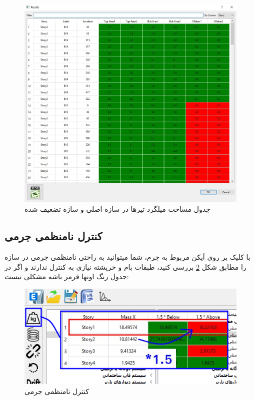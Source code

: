 \begin{figure}
    \centering
    \includegraphics[scale=.6]{figures/weakness_beam}
    \caption{جدول مساحت میلگرد تیرها در سازه اصلی و سازه تضعیف شده}
    \label{pic:weakness_beam}
\end{figure}

\subsection{کنترل نامنظمی جرمی}
با کلیک بر روی آیکن مربوط به جرم، شما میتوانید به راحتی نامنظمی جرمی در سازه را مطابق شکل 
\ref{pic:mass_irregularity}
بررسی کنید، طبقات بام و خرپشته نیازی به کنترل ندارند و اگر در جدول رنگ اونها قرمز باشه مشکلی نیست:

\begin{figure}[H]
    \centering
    \includegraphics[scale=.7]{figures/mass_irregularity}
    \caption{کنترل نامنظمی جرمی}
    \label{pic:mass_irregularity}
\end{figure}
